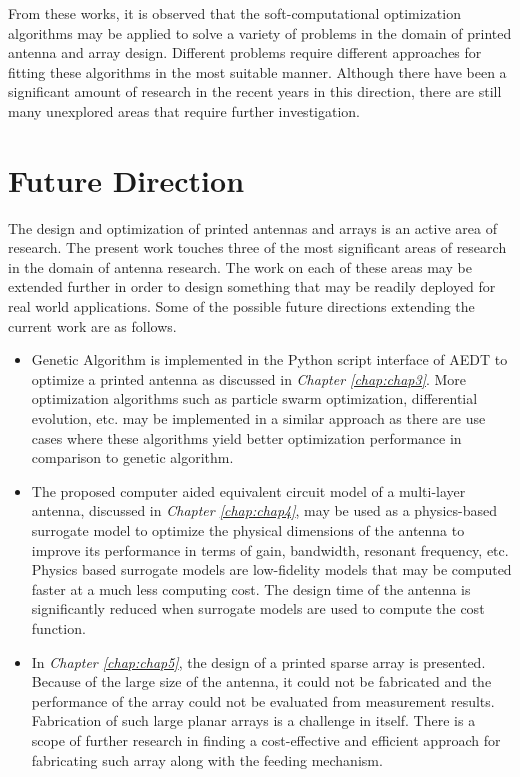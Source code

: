 From these works, it is observed that the soft-computational optimization algorithms may be applied to solve a variety of problems in the domain of printed antenna and array design. Different problems require different approaches for fitting these algorithms in the most suitable manner. Although there have been a significant amount of research in the recent years in this direction, there are still many unexplored areas that require further investigation.

\section{Future Direction}
The design and optimization of printed antennas and arrays is an active area of research. The present work touches three of the most significant areas of research in the domain of antenna research. The work on each of these areas may be extended further in order to design something that may be readily deployed for real world applications. Some of the possible future directions extending the current work are as follows.
\begin{itemize}
\item Genetic Algorithm is implemented in the Python script interface of AEDT to optimize a printed antenna as discussed in \emph{Chapter \ref{chap:chap3}}. More optimization algorithms such as particle swarm optimization, differential evolution, etc. may be implemented in a similar approach as there are use cases where these algorithms yield better optimization performance in comparison to genetic algorithm.
\item The proposed computer aided equivalent circuit model of a multi-layer antenna, discussed in \emph{Chapter \ref{chap:chap4}}, may be used as a physics-based surrogate model to optimize the physical dimensions of the antenna to improve its performance in terms of gain, bandwidth, resonant frequency, etc. Physics based surrogate models are low-fidelity models that may be computed faster at a much less computing cost. The design time of the antenna is significantly reduced when surrogate models are used to compute the cost function.
\item In  \emph{Chapter \ref{chap:chap5}}, the design of a printed sparse array is presented. Because of the large size of the antenna, it could not be fabricated and the performance of the array could not be evaluated from measurement results. Fabrication of such large planar arrays is a challenge in itself. There is a scope of further research in finding a cost-effective and efficient approach for fabricating such array along with the feeding mechanism. 
\end{itemize} 
